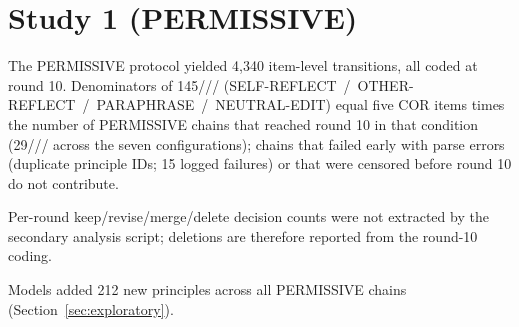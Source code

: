 \section{Study 1 (PERMISSIVE)}\label{app:study1}
The PERMISSIVE protocol yielded 4,340 item-level transitions, all coded at round 10.
Denominators of 145/// (SELF-REFLECT\allowbreak\ /\ OTHER-REFLECT\allowbreak\ /\ PARAPHRASE\allowbreak\ /\ NEUTRAL-EDIT) equal five COR items times the number of PERMISSIVE chains that reached round 10 in that condition (29/// across the seven configurations); chains that failed early with parse errors (duplicate principle IDs; 15 logged failures) or that were censored before round 10 do not contribute.



Per-round keep/revise/merge/delete decision counts were not extracted by the secondary analysis script; deletions are therefore reported from the round-10 coding.

Models added 212 new principles across all PERMISSIVE chains (Section~\ref{sec:exploratory}).
